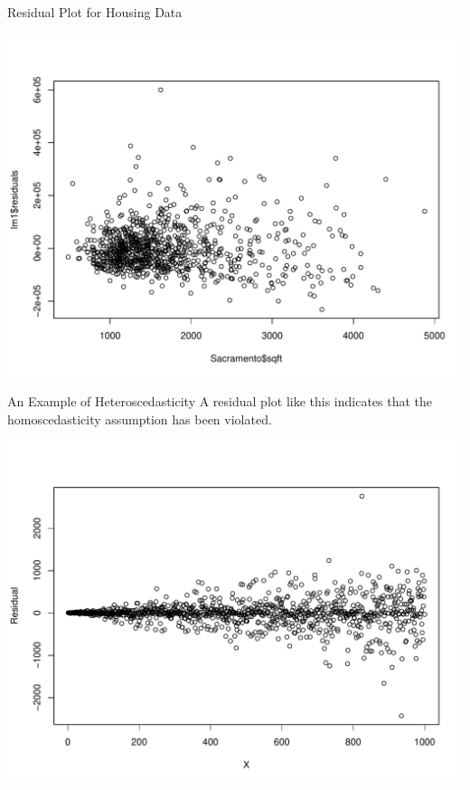\documentclass{beamer}
\begin{document}
\begin{frame}{Residual Plot for Housing Data}
    \begin{center}
        \includegraphics[width=.9\linewidth]{figures/housing-resid.pdf}
    \end{center}
\end{frame}

\begin{frame}{An Example of Heteroscedasticity}
    A residual plot like this indicates that the homoscedasticity assumption has been violated.
    \begin{center}
        \includegraphics[width=.9\linewidth]{figures/heteroscedasticity.pdf}
    \end{center}
\end{frame}
\end{document}
